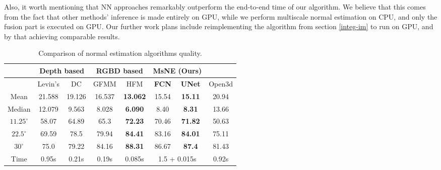 Also, it worth mentioning that NN approaches remarkably outperform the end-to-end time of our algorithm. We believe that this comes from the fact that other methods' inference is made entirely on GPU, while we perform multiscale normal estimation on CPU, and only the fusion part is executed on GPU. Our further work plans include reimplementing the algorithm from section \ref{integ-im} to run on GPU, and by that achieving comparable results.

\begin{table}
\centering
\begin{tabular}{ | c | c | c | c | c | c | c | c | }
\hline
 & \multicolumn{2}{|c|}{Depth based} & \multicolumn{2}{|c|}{RGBD based} & \multicolumn{2}{|c|}{\textbf{MsNE (Ours)}} & \\
 \hline
 & Levin's \cite{colorization-using-optimization} & DC \cite{deep_depth_compl} & GFMM \cite{guided-depth-enhancement} & HFM \cite{deep_surf} & \textbf{FCN} & \textbf{UNet} & Open3d \cite{open3d} \\
 \hline
 Mean & 21.588  & 19.126 & 16.537 & \textbf{13.062} & 15.54 & \textbf{15.11} & 20.94 \\  
 \hline
 Median & 12.079  & 9.563 & 8.028 & \textbf{6.090} & 8.40 & \textbf{8.31} & 13.66 \\  
 \hline
 $11.25^{\circ}$ & 58.07  & 64.89 & 65.3 & \textbf{72.23} & 70.46 & \textbf{71.82} & 50.63\\
 \hline
 $22.5^{\circ}$ & 69.59 & 78.5 & 79.94 & \textbf{84.41} & 83.16 & \textbf{84.01} & 75.11 \\
 \hline
 $30^{\circ}$ & 75.0  & 79.22 & 84.16 & \textbf{88.31} & 86.67 & \textbf{87.4} & 81.43 \\
 \hline
  Time & 0.95s  & 0.21s &  0.19s & 0.085s & \multicolumn{2}{|c|}{1.5 + 0.015s} & 0.92s \\
  \hline
\end{tabular}
\caption{Comparison of normal estimation algorithms quality.}
\label{table:qual}
\end{table}
